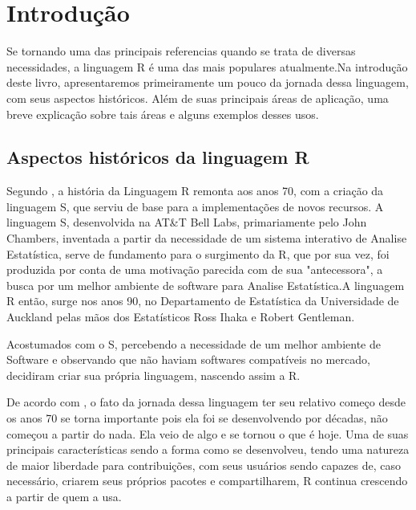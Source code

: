 %



\chapter{ Introdu\c{c}\~{a}o}

Se tornando uma das principais referencias quando se trata de diversas necessidades, a linguagem R é uma das mais populares atualmente.Na introdução deste livro, apresentaremos primeiramente um pouco da jornada dessa linguagem, com seus aspectos históricos. Além de suas principais áreas de aplicação, uma breve explicação sobre tais áreas e  alguns exemplos desses usos.

   \section{Aspectos hist\'{o}ricos da linguagem R}

Segundo \cite{Lander2017}, a história da Linguagem R remonta aos anos 70, com a criação da linguagem S, que serviu de base para a implementações de novos recursos.
A linguagem S, desenvolvida na AT\&T Bell Labs, primariamente pelo John Chambers, inventada a partir da necessidade de um sistema interativo de Analise Estatística, serve de fundamento para o surgimento da R, que por sua vez, foi produzida por conta de uma motivação parecida com de sua "antecessora", a busca por um melhor ambiente de software para Analise Estatística.A linguagem R então, surge nos anos 90, no Departamento de Estatística da Universidade de Auckland pelas mãos dos Estatísticos Ross Ihaka e Robert Gentleman.

Acostumados com o S, percebendo a necessidade de um melhor ambiente de Software e observando que não haviam softwares compatíveis no mercado, decidiram criar sua própria linguagem, nascendo assim a R.

De acordo com \cite{Cotton2013}, o fato da jornada dessa linguagem ter seu relativo começo desde os anos 70 se torna importante pois ela foi se desenvolvendo por décadas, não começou a partir do nada. Ela veio de algo e se tornou o que é hoje. 
Uma de suas principais características sendo a forma como se desenvolveu, tendo uma natureza de maior liberdade para contribuições, com seus usuários sendo capazes de, caso necessário, criarem seus próprios pacotes e compartilharem, R continua crescendo a partir de quem a usa.\cite{Chang2019}

